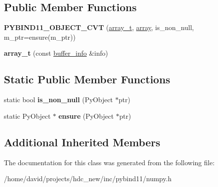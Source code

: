 \subsection*{Public Member Functions}
\begin{DoxyCompactItemize}
\item 
{\bfseries P\+Y\+B\+I\+N\+D11\+\_\+\+O\+B\+J\+E\+C\+T\+\_\+\+C\+VT} (\hyperlink{classarray__t}{array\+\_\+t}, \hyperlink{classarray}{array}, is\+\_\+non\+\_\+null, m\+\_\+ptr=ensure(m\+\_\+ptr))\hypertarget{classarray__t_aa3be5d4ef90b41eb8f543539ae56f4df}{}\label{classarray__t_aa3be5d4ef90b41eb8f543539ae56f4df}

\item 
{\bfseries array\+\_\+t} (const \hyperlink{structbuffer__info}{buffer\+\_\+info} \&info)\hypertarget{classarray__t_ab16a1d127243be1853d6c03c7c853160}{}\label{classarray__t_ab16a1d127243be1853d6c03c7c853160}

\end{DoxyCompactItemize}
\subsection*{Static Public Member Functions}
\begin{DoxyCompactItemize}
\item 
static bool {\bfseries is\+\_\+non\+\_\+null} (Py\+Object $\ast$ptr)\hypertarget{classarray__t_ae79ddd2ed7898a3b6ba8c7c6b22dbd71}{}\label{classarray__t_ae79ddd2ed7898a3b6ba8c7c6b22dbd71}

\item 
static Py\+Object $\ast$ {\bfseries ensure} (Py\+Object $\ast$ptr)\hypertarget{classarray__t_a3adf2fe263a1092b19bbab032d00e106}{}\label{classarray__t_a3adf2fe263a1092b19bbab032d00e106}

\end{DoxyCompactItemize}
\subsection*{Additional Inherited Members}


The documentation for this class was generated from the following file\+:\begin{DoxyCompactItemize}
\item 
/home/david/projects/hdc\+\_\+new/inc/pybind11/numpy.\+h\end{DoxyCompactItemize}
